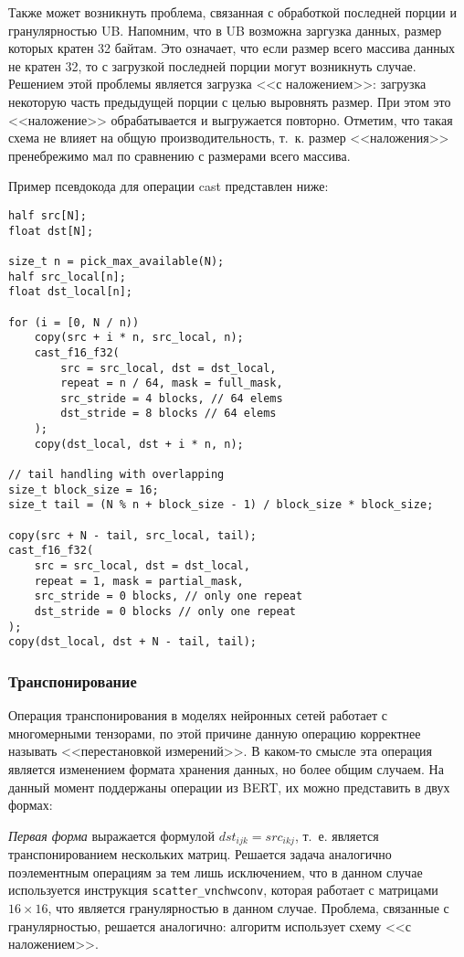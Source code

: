 Также может возникнуть проблема, связанная с обработкой последней порции и
гранулярностью UB. Напомним, что в UB возможна заргузка данных, размер которых
кратен 32 байтам. Это означает, что если размер всего массива данных не кратен
32, то с загрузкой последней порции могут возникнуть случае. Решением этой
проблемы является загрузка <<с наложением>>: загрузка некоторую часть предыдущей
порции с целью выровнять размер. При этом это <<наложение>> обрабатывается и
выгружается повторно. Отметим, что такая схема не влияет на общую
производительность, т.~к. размер <<наложения>> пренебрежимо мал по сравнению
с размерами всего массива.

Пример псевдокода для операции cast представлен ниже:

\begin{lstlisting}
half src[N];
float dst[N];

size_t n = pick_max_available(N);
half src_local[n];
float dst_local[n];

for (i = [0, N / n))
    copy(src + i * n, src_local, n);
    cast_f16_f32(
        src = src_local, dst = dst_local,
        repeat = n / 64, mask = full_mask,
        src_stride = 4 blocks, // 64 elems
        dst_stride = 8 blocks // 64 elems
    );
    copy(dst_local, dst + i * n, n);

// tail handling with overlapping
size_t block_size = 16;
size_t tail = (N % n + block_size - 1) / block_size * block_size;

copy(src + N - tail, src_local, tail);
cast_f16_f32(
    src = src_local, dst = dst_local,
    repeat = 1, mask = partial_mask,
    src_stride = 0 blocks, // only one repeat
    dst_stride = 0 blocks // only one repeat
);
copy(dst_local, dst + N - tail, tail);
\end{lstlisting}

\subsubsection{Транспонирование}

Операция транспонирования в моделях нейронных сетей работает с многомерными
тензорами, по этой причине данную операцию корректнее называть <<перестановкой
измерений>>. В каком-то смысле эта операция является изменением формата хранения
данных, но более общим случаем. На данный момент поддержаны операции из BERT,
их можно представить в двух формах:

\textit{Первая форма} выражается формулой $dst_{ijk} = src_{ikj}$, т.~е.
является транспонированием нескольких матриц. Решается задача аналогично
поэлементным операциям за тем лишь исключением, что в данном случае используется
инструкция \texttt{scatter\_vnchwconv}, которая работает с матрицами
$16 \times 16$, что является гранулярностью в данном случае. Проблема, связанные
с гранулярностью, решается аналогично: алгоритм использует схему <<с наложением>>.

